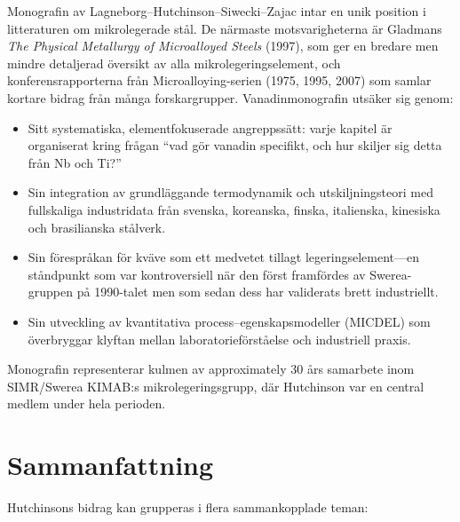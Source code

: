 \documentclass[11pt,a4paper]{article}
\begin{document}
Monografin av Lagneborg--Hutchinson--Siwecki--Zajac intar en unik
position i litteraturen om mikrolegerade st\aa{}l.  De n\"armaste
motsvarigheterna \"ar Gladmans \emph{The Physical Metallurgy of
Microalloyed Steels} (1997), som ger en bredare men mindre detaljerad
\"oversikt av alla mikrolegeringselement, och konferensrapporterna fr\aa{}n
Microalloying-serien (1975, 1995, 2007) som samlar kortare bidrag
fr\aa{}n m\aa{}nga forskargrupper.  Vanadinmonografin uts\"aker sig genom:
\begin{itemize}
  \item Sitt systematiska, elementfokuserade angreppss\"att: varje
    kapitel \"ar organiserat kring fr\aa{}gan ``vad g\"or vanadin
    specifikt, och hur skiljer sig detta fr\aa{}n Nb och Ti?''
  \item Sin integration av grundl\"aggande termodynamik och
    utskiljningsteori med fullskaliga industridata fr\aa{}n svenska,
    koreanska, finska, italienska, kinesiska och brasilianska st\aa{}lverk.
  \item Sin f\"orespr\aa{}kan f\"or kv\"ave som ett medvetet tillagt
    legeringselement---en st\aa{}ndpunkt som var kontroversiell n\"ar den
    f\"orst framf\"ordes av Swerea-gruppen p\aa{} 1990-talet men som
    sedan dess har validerats brett industriellt.
  \item Sin utveckling av kvantitativa process--egenskapsmodeller (MICDEL)
    som \"overbryggar klyftan mellan laboratorief\"orst\aa{}else och
    industriell praxis.
\end{itemize}

Monografin representerar kulmen av approximately 30 \aa{}rs
samarbete inom SIMR/Swerea KIMAB:s mikrolegeringsgrupp, d\"ar
Hutchinson var en central medlem under hela perioden.

\section*{Sammanfattning}

Hutchinsons bidrag kan grupperas i flera sammankopplade teman:
\end{document}
